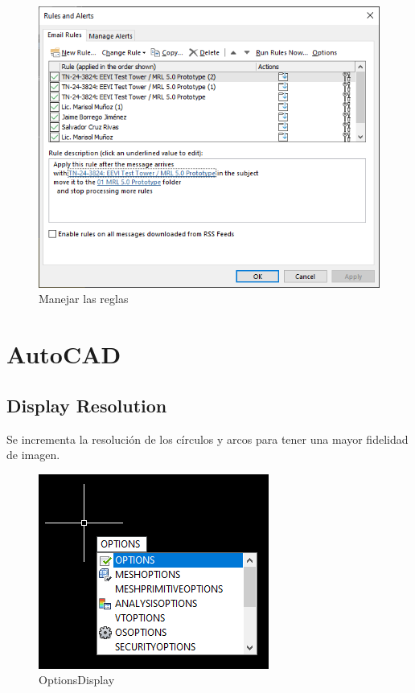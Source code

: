 \documentclass{report}
\begin{document}
\begin{figure}[H]
	\centering
	\includegraphics[width=0.75\linewidth, height=0.35\textheight,keepaspectratio]{Imagenes/outlook_rules07}
	\caption{Manejar las reglas}
	\label{fig:outlookrules07}
\end{figure}


\part{AutoCAD}

\chapter{Display Resolution}

Se incrementa la resolución de los círculos y arcos para tener una mayor fidelidad de imagen.

\begin{figure}[H]
	\centering
	\includegraphics[width=0.75\linewidth, height=0.5\textheight,keepaspectratio]{Imagenes/autocad_display_resolution_01}
	\caption{Options\textrightarrow Display}
	\label{fig:autocaddisplayresolution01}
\end{figure}
\end{document}
